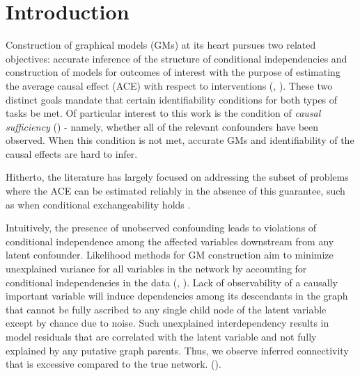 \documentclass{article}
\begin{document}
\section{Introduction}
\label{introduction}

Construction of graphical models (GMs) at its heart pursues two related objectives: accurate inference of the structure of conditional independencies and construction of models for outcomes of interest with the purpose of estimating the average causal effect (ACE) with respect to interventions (\cite{pearl_causality:_2000}, \cite{hernan_estimating_2006}).  These two distinct goals mandate that certain identifiability conditions for both types of tasks be met.  Of particular interest to this work is the condition of \textit{causal sufficiency} (\cite{spirtes_causation_1993}) - namely, whether all of the relevant confounders have been observed.  When this condition is not met, accurate GMs and identifiability of the causal effects are hard to infer.

Hitherto, the literature has largely focused on addressing the subset of problems where the ACE can be estimated reliably in the absence of this guarantee, such as when conditional exchangeability holds \cite{hernan_estimating_2006}.  

Intuitively, the presence of unobserved confounding leads to violations of conditional independence among the affected variables downstream from any latent confounder.  Likelihood methods for GM construction aim to minimize unexplained variance for all variables in the network by accounting for conditional independencies in the data (\cite{pearl_causality:_2000}, \cite{friedman_being_2013}).  Lack of observability of a causally important variable will induce dependencies among its descendants in the graph that cannot be fully ascribed to any single child node of the latent variable except by chance due to noise.  Such unexplained interdependency results in model residuals that are correlated with the latent variable and not fully explained by any putative graph parents. Thus, we observe inferred connectivity that is excessive compared to the true network.  (\cite{elidan_discovering_2001}).  
\end{document}
